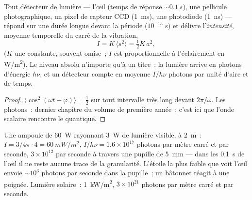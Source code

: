 \begin{proposition}\label{prop:b2:scalar-light-model:intensity}
Tout détecteur de lumière --- l'œil (temps de réponse $\sim\qty{0.1}{s}$), une
pellicule photographique, un pixel de capteur CCD (\qty{1}{ms}), une photodiode (\qty{1}{ns}) ---
répond sur une durée longue devant la période ($10^{-15}$ s) et
délivre l'\emph{intensité}, moyenne temporelle du carré de la
vibration,
\[
I = K\,\langle s^2\rangle = \tfrac12K\,a^2 ,
\]
($K$ une constante, souvent omise~; $I$ est proportionnelle à l'éclairement
en \unit{W/m^2}). Le niveau absolu n'importe qu'à un titre~: la lumière
arrive en photons d'énergie $h\nu$, et un détecteur compte en moyenne
$I/h\nu$ photons par unité d'aire et de temps.
\end{proposition}

\begin{proof}
$\langle\cos^2(\omega t - \varphi)\rangle = \tfrac12$ sur tout intervalle très long
devant $2\pi/\omega$. Les photons~: dernier chapitre du volume de première année~; c'est
ici que l'onde scalaire rencontre le quantique.
\end{proof}

\begin{example}\label{ex:b2:scalar-light-model:orders}
Une ampoule de \qty{60}{W} rayonnant \qty{3}{W} de lumière visible, à \qty{2}{m}~:
$I = 3/4\pi\cdot4 = \qty{60}{mW/m^2}$, $I/h\nu = 1.6 \times 10^{17}$ photons par mètre
carré et par seconde, $3 \times 10^{12}$ par seconde à travers une pupille de \qty{5}{mm} ---
dans les \qty{0.1}{s} de l'œil il ne reste aucune trace de la granularité.
L'étoile la plus faible que voit l'œil envoie $\sim 10^3$ photons par seconde dans la
pupille~; un bâtonnet réagit à une poignée. Lumière solaire~: \qty{1}{kW/m^2}, $3 \times 10^{21}$
photons par mètre carré et par seconde.
\end{example}

